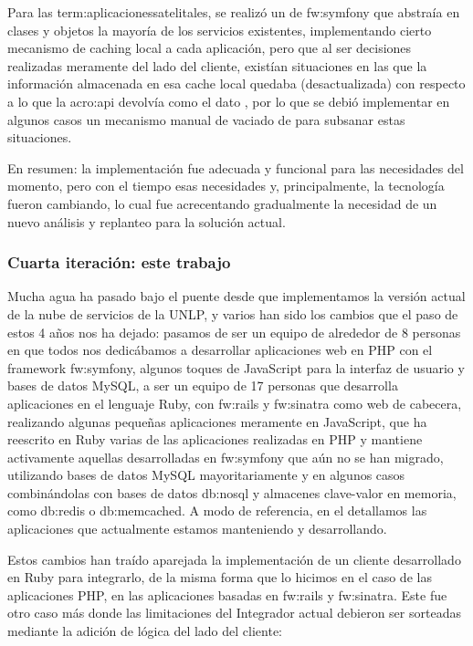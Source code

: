 Para las \gls{term:aplicacionessatelitales}, se realizó un  de \gls{fw:symfony} que abstraía en clases y objetos la mayoría de los servicios existentes, implementando cierto mecanismo de caching local a cada aplicación, pero que al ser decisiones realizadas meramente del lado del cliente, existían situaciones en las que la información almacenada en esa cache local quedaba  (desactualizada) con respecto a lo que la \gls{acro:api} devolvía como el dato , por lo que se debió implementar en algunos casos un mecanismo manual de vaciado de  para subsanar estas situaciones.

En resumen: la implementación fue adecuada y funcional para las necesidades del momento, pero con el tiempo esas necesidades y, principalmente, la tecnología fueron cambiando, lo cual fue acrecentando gradualmente la necesidad de un nuevo análisis y replanteo para la solución actual.


\subsubsection{Cuarta iteración: este trabajo}
\label{nube:etapa4}

Mucha agua ha pasado bajo el puente desde que implementamos la versión actual de la nube de servicios de la UNLP, y varios han sido los cambios que el paso de estos 4 años nos ha dejado: pasamos de ser un equipo de alrededor de 8 personas en que todos nos dedicábamos a desarrollar aplicaciones web en PHP con el framework \gls{fw:symfony}, algunos toques de JavaScript para la interfaz de usuario y bases de datos MySQL, a ser un equipo de 17 personas que desarrolla aplicaciones en el lenguaje Ruby, con \gls{fw:rails} y \gls{fw:sinatra} como  web de cabecera, realizando algunas pequeñas aplicaciones meramente en JavaScript, que ha reescrito en Ruby varias de las aplicaciones realizadas en PHP y mantiene activamente aquellas desarrolladas en \gls{fw:symfony} que aún no se han migrado, utilizando bases de datos MySQL mayoritariamente y en algunos casos combinándolas con bases de datos \gls{db:nosql} y almacenes clave-valor en memoria, como \gls{db:redis} o \gls{db:memcached}. A modo de referencia, en el   detallamos las aplicaciones que actualmente estamos manteniendo y desarrollando.

Estos cambios han traído aparejada la implementación de un cliente desarrollado en Ruby para integrarlo, de la misma forma que lo hicimos en el caso de las aplicaciones PHP, en las aplicaciones basadas en \gls{fw:rails} y \gls{fw:sinatra}. Este fue otro caso más donde las limitaciones del Integrador actual debieron ser sorteadas mediante la adición de lógica del lado del cliente:


